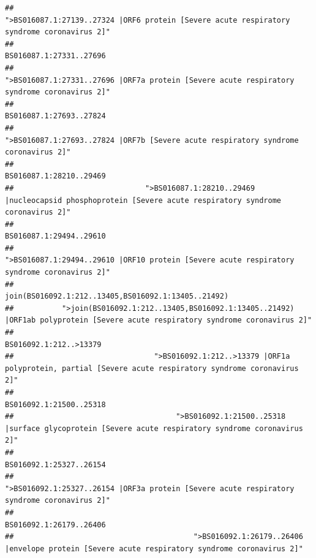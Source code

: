 \documentclass[
]{article}
\begin{document}
\begin{verbatim}
##                                             ">BS016087.1:27139..27324 |ORF6 protein [Severe acute respiratory syndrome coronavirus 2]" 
##                                                                                                                BS016087.1:27331..27696 
##                                            ">BS016087.1:27331..27696 |ORF7a protein [Severe acute respiratory syndrome coronavirus 2]" 
##                                                                                                                BS016087.1:27693..27824 
##                                                    ">BS016087.1:27693..27824 |ORF7b [Severe acute respiratory syndrome coronavirus 2]" 
##                                                                                                                BS016087.1:28210..29469 
##                              ">BS016087.1:28210..29469 |nucleocapsid phosphoprotein [Severe acute respiratory syndrome coronavirus 2]" 
##                                                                                                                BS016087.1:29494..29610 
##                                            ">BS016087.1:29494..29610 |ORF10 protein [Severe acute respiratory syndrome coronavirus 2]" 
##                                                                                    join(BS016092.1:212..13405,BS016092.1:13405..21492) 
##           ">join(BS016092.1:212..13405,BS016092.1:13405..21492) |ORF1ab polyprotein [Severe acute respiratory syndrome coronavirus 2]" 
##                                                                                                                 BS016092.1:212..>13379 
##                                ">BS016092.1:212..>13379 |ORF1a polyprotein, partial [Severe acute respiratory syndrome coronavirus 2]" 
##                                                                                                                BS016092.1:21500..25318 
##                                     ">BS016092.1:21500..25318 |surface glycoprotein [Severe acute respiratory syndrome coronavirus 2]" 
##                                                                                                                BS016092.1:25327..26154 
##                                            ">BS016092.1:25327..26154 |ORF3a protein [Severe acute respiratory syndrome coronavirus 2]" 
##                                                                                                                BS016092.1:26179..26406 
##                                         ">BS016092.1:26179..26406 |envelope protein [Severe acute respiratory syndrome coronavirus 2]" 

\end{verbatim}
\end{document}
